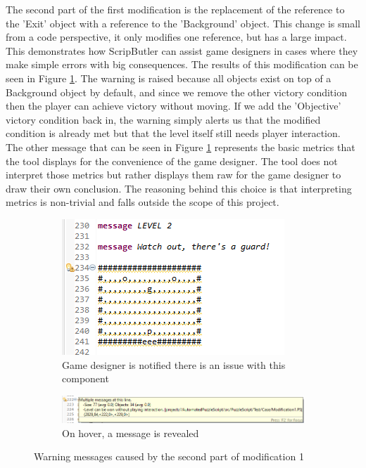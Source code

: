 The second part of the first modification is the replacement of the reference to the 'Exit' object with a reference to the 'Background' object. This change is small from a code perspective, it only modifies one reference, but has a large impact. This demonstrates how ScripButler can assist game designers in cases where they make simple errors with big consequences. The results of this modification can be seen in Figure \ref{fig:modification_1_results_part2}. The warning is raised because all objects exist on top of a Background object by default, and since we remove the other victory condition then the player can achieve victory without moving. If we add the 'Objective' victory condition back in, the warning simply alerts us that the modified condition is already met but that the level itself still needs player interaction. The other message that can be seen in Figure \ref{fig:modification_1_results_part2} represents the basic metrics that the tool displays for the convenience of the game designer. The tool does not interpret those metrics but rather displays them raw for the game designer to draw their own conclusion. The reasoning behind this choice is that interpreting metrics is non-trivial and falls outside the scope of this project. 

\begin{figure}[!t]
    \begin{subfigure}{1\textwidth}
        \centering
        \includegraphics[scale=1.25]{images/case_results/Modification_1_Results_part2_IDE.png}
        \caption{Game designer is notified there is an issue with this component}
    \end{subfigure}
    \begin{subfigure}{1\textwidth}
        \centering
        \includegraphics[scale=0.9]{images/case_results/Modification_1_Results_part2.png}
        \caption{On hover, a message is revealed}
    \end{subfigure}
    \caption{Warning messages caused by the second part of modification 1}
    \label{fig:modification_1_results_part2}
\end{figure}

